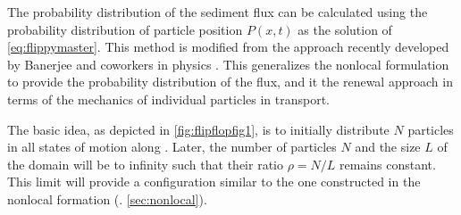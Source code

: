 The probability distribution of the sediment flux can be calculated using the probability distribution of particle position $P(x,t)$ \DIFdelbegin {}\DIFdelend \DIFaddbegin {}\DIFaddend as the solution of \DIFdelbegin {}\DIFdelend \DIFaddbegin {}\DIFaddend \ref{eq:flippymaster}.
This method is modified from the approach recently developed by Banerjee and coworkers in physics \citep{Banerjee2020}.
This generalizes the nonlocal formulation \DIFdelbegin \DIFdel{(\ref{sec:nonlocal} ) }\DIFdelend \DIFaddbegin {}\DIFaddend to provide the probability distribution of the flux, and it \DIFdelbegin {}\DIFdelend \DIFaddbegin {}\DIFaddend the renewal approach \DIFdelbegin {}\DIFdelend \DIFaddbegin {}\DIFaddend in terms of the mechanics of individual particles in transport.

The basic idea, as depicted in \DIFdelbegin {}\DIFdelend \DIFaddbegin {}\DIFaddend \ref{fig:flipflopfig1}, is to initially distribute $N$ particles in all states of motion along \DIFdelbegin {}\DIFdelend \DIFaddbegin {}\DIFaddend .
Later, the number of particles $N$ and the size $L$ of the domain will be \DIFdelbegin {}\DIFdelend \DIFaddbegin {}\DIFaddend to infinity such that their ratio $\rho=N/L$ remains constant.
This limit will provide a configuration similar to the one constructed in the nonlocal formation (\DIFdelbegin {}\DIFdelend \DIFaddbegin {}\DIFaddend . \ref{sec:nonlocal}).

